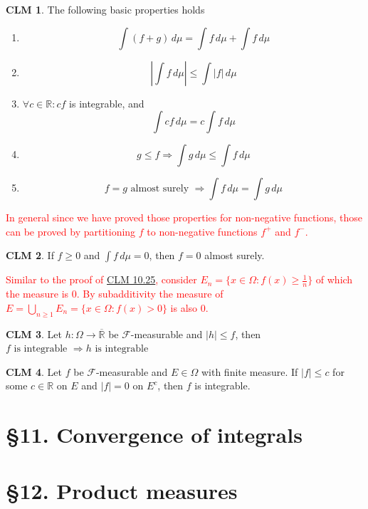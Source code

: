 \documentclass[hidelinks]{article}
\theoremstyle{definition}
\theoremstyle{dotless}
\newtheorem{claim}{CLM}[section]
\theoremstyle{remark}
\begin{document}
\begin{claim}
The following basic properties holds
\begin{enumerate}[label=\arabic*\degree]
    \item\[\int(f+g)\,d\mu=\int f\,d\mu+\int f\,d\mu\]
    \item\[|\int f\,d\mu|\leq\int|f|\,d\mu\]
    \item$\forall c\in\mathbb{R}:cf$ is integrable, and
    \[\int cf\,d\mu=c\int f\,d\mu\]
    \item\[g\leq f\Rightarrow\int g\,d\mu\leq\int f\,d\mu\]
    \item\[f=g\textrm{ almost surely }\Rightarrow\int f\,d\mu=\int g\,d\mu\]
\end{enumerate}
\end{claim}
\textcolor{red}{In general since we have proved those properties for non-negative functions, those can be proved by partitioning $f$ to non-negative functions $f^+$ and $f^-$.}

\begin{claim}
If $f\geq0$ and $\int f\,d\mu=0$, then $f=0$ almost surely.
\end{claim}
\textcolor{red}{Similar to the proof of \hyperref[CLM 10.25]{CLM 10.25}, consider $E_n=\{x\in\Omega:f(x)\geq\frac{1}{n}\}$ of which the measure is $0$. By subadditivity the measure of $E=\bigcup_{n\geq1}E_n=\{x\in\Omega:f(x)>0\}$ is also $0$.}

\begin{claim}
Let $h:\Omega\to\overline{\mathbb{R}}$ be $\mathscr{F}$-measurable and $|h|\leq f$, then $f\textrm{ is integrable }\Rightarrow h\textrm{ is integrable}$
\end{claim}

\begin{claim}
Let $f$ be $\mathscr{F}$-measurable and $E\in\Omega$ with finite measure. If $|f|\leq c$ for some $c\in\mathbb{R}$ on $E$ and $|f|=0$ on $E^c$, then $f$  is integrable.
\end{claim}

\bigbreak

\section*{\S11. Convergence of integrals}
\setcounter{section}{11}

\bigbreak

\section*{\S12. Product measures}
\setcounter{section}{12}
\end{document}
